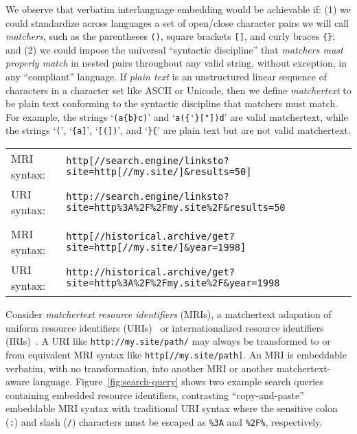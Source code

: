 We observe that verbatim interlanguage embedding would be achievable if:
(1)
we could standardize across languages
a set of open/close character pairs
we will call \emph{matchers},
such as the parentheses \verb|()|,
square brackets \verb|[]|,
and curly braces \verb|{}|;
and
(2) 
we could impose the universal ``syntactic discipline''
that \emph{matchers must properly match} in nested pairs
throughout any valid string, without exception,
in any ``compliant'' language.
If \emph{plain text} is an unstructured linear sequence of characters
in a character set like ASCII or Unicode,
then we define \emph{matchertext} to be plain text
conforming to the syntactic discipline
that matchers must match.
For example, the strings `\verb|(a{b}c)|' and `\verb|a({'}["])d|'
are valid matchertext,
while the strings
`\verb|(|', `\verb|{a]|', `\verb|[(])|', and `\verb|}{|'
are plain text but are not valid matchertext.

\begin{figure*}
\begin{center}
\begin{small}
\begin{tabular}{ll}
MRI syntax:	& \verb|http[//search.engine/linksto?site=http[//my.site/]&results=50]| \\
URI syntax:	& \verb|http://search.engine/linksto?site=http%3A%2F%2Fmy.site%2F&results=50| \\
\\
MRI syntax:	& \verb|http[//historical.archive/get?site=http[//my.site/]&year=1998]| \\
URI syntax:	& \verb|http://historical.archive/get?site=http%3A%2F%2Fmy.site%2F&year=1998| \\
\end{tabular}
\end{small}
\end{center}
\label{fig:search-query}
\caption{Example queries containing embedded resource identifiers
	in URI and MRI syntax for comparison.}
\end{figure*}

Consider \emph{matchertext resource identifiers} (MRIs),
a matchertext adapation of
uniform resource identifiers (URIs)~\cite{rfc3986} or
internationalized resource identifiers (IRIs)~\cite{rfc3987}.
A URI like \verb|http://my.site/path/|
may always be transformed to or from
equivalent MRI syntax like \verb|http[//my.site/path]|.
An MRI is embeddable verbatim, with no transformation,
into another MRI or another matchertext-aware language.
Figure~\ref{fig:search-query} shows two example search queries
containing embedded resource identifiers,
contrasting ``copy-and-paste'' embeddable MRI syntax
with traditional URI syntax where the sensitive
colon (\verb|:|) and slash (\verb|/|) characters
must be escaped as \verb|%3A| and \verb|%2F%|, respectively.

